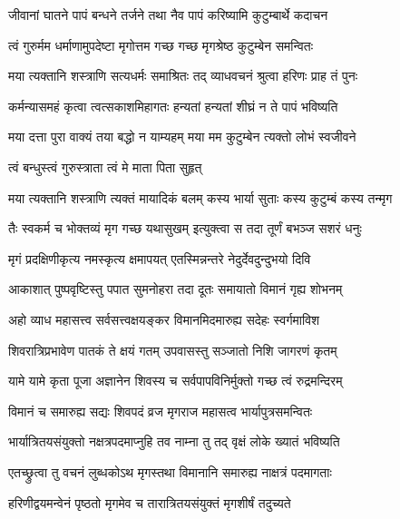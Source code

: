 \twolineshloka
{जीवानां घातने पापं बन्धने तर्जने तथा}
{नैव पापं करिष्यामि कुटुम्बार्थे कदाचन}%

\twolineshloka
{त्वं गुरुर्मम धर्माणामुपदेष्टा मृगोत्तम}
{गच्छ गच्छ मृगश्रेष्ठ कुटुम्बेन समन्वितः}%

\twolineshloka
{मया त्यक्तानि शस्त्राणि सत्यधर्मः समाश्रितः}
{तद् व्याधवचनं श्रुत्वा हरिणः प्राह तं पुनः}%


\twolineshloka
{कर्मन्यासमहं कृत्वा त्वत्सकाशमिहागतः}
{हन्यतां हन्यतां शीघ्रं न ते पापं भविष्यति}%

\twolineshloka
{मया दत्ता पुरा वाक्यं तया बद्धो न याम्यहम्}
{मया मम कुटुम्बेन त्यक्तो लोभं स्वजीवने}%


\onelineshloka
{त्वं बन्धुस्त्वं गुरुस्त्राता त्वं मे माता पिता सुहृत्}%

\twolineshloka
{मया त्यक्तानि शस्त्राणि त्यक्तं मायादिकं बलम्}
{कस्य भार्या सुताः कस्य कुटुम्बं कस्य तन्मृग}%

\twolineshloka
{तैः स्वकर्म च भोक्तव्यं मृग गच्छ यथासुखम्}
{इत्युक्त्वा स तदा तूर्णं बभञ्ज सशरं धनुः}%

\twolineshloka
{मृगं प्रदक्षिणीकृत्य नमस्कृत्य क्षमापयत्}
{एतस्मिन्नन्तरे नेदुर्देवदुन्दुभयो दिवि}%

\twolineshloka
{आकाशात् पुष्पवृष्टिस्तु पपात सुमनोहरा}
{तदा दूतः समायातो विमानं गृह्य शोभनम्}%


\twolineshloka
{अहो व्याध महासत्त्व सर्वसत्त्वक्षयङ्कर}
{विमानमिदमारुह्य सदेहः स्वर्गमाविश}%

\twolineshloka
{शिवरात्रिप्रभावेण पातकं ते क्षयं गतम्}
{उपवासस्तु सञ्जातो निशि जागरणं कृतम्}%

\twolineshloka
{यामे यामे कृता पूजा अज्ञानेन शिवस्य च}
{सर्वपापविनिर्मुक्तो गच्छ त्वं रुद्रमन्दिरम्}%

\twolineshloka
{विमानं च समारुह्य सद्यः शिवपदं व्रज}
{मृगराज महासत्व भार्यापुत्रसमन्वितः}%

\twolineshloka
{भार्यात्रितयसंयुक्तो नक्षत्रपदमाप्नुहि}
{तव नाम्ना तु तद् वृक्षं लोके ख्यातं भविष्यति}%

\twolineshloka
{एतच्छ्रुत्वा तु वचनं लुब्धकोऽथ मृगस्तथा}
{विमानानि समारुह्य नाक्षत्रं पदमागताः}%

\twolineshloka
{हरिणीद्वयमन्वेनं पृष्ठतो मृगमेव च}
{तारात्रितयसंयुक्तं मृगशीर्षं तदुच्यते}%

